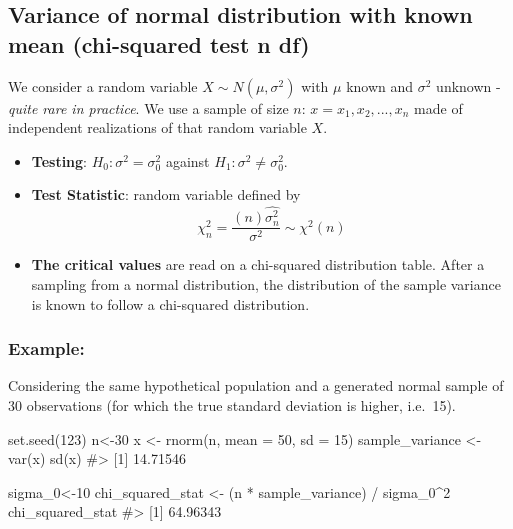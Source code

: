 \documentclass[
  letterpaper,
  DIV=11,
  numbers=noendperiod]{scrreprt}
\newenvironment{Shaded}{\begin{snugshade}}{\end{snugshade}}
\newcommand{\AttributeTok}[1]{\textcolor[rgb]{0.40,0.45,0.13}{#1}}
\newcommand{\CommentTok}[1]{\textcolor[rgb]{0.37,0.37,0.37}{#1}}
\newcommand{\DecValTok}[1]{\textcolor[rgb]{0.68,0.00,0.00}{#1}}
\newcommand{\FunctionTok}[1]{\textcolor[rgb]{0.28,0.35,0.67}{#1}}
\newcommand{\NormalTok}[1]{\textcolor[rgb]{0.00,0.23,0.31}{#1}}
\newcommand{\OtherTok}[1]{\textcolor[rgb]{0.00,0.23,0.31}{#1}}
\newcommand{\SpecialCharTok}[1]{\textcolor[rgb]{0.37,0.37,0.37}{#1}}
\providecommand{\tightlist}{%
  \setlength{\itemsep}{0pt}\setlength{\parskip}{0pt}}\usepackage{longtable,booktabs,array}
\begin{document}
\subsection{Variance of normal distribution with known mean (chi-squared
test n
df)}\label{variance-of-normal-distribution-with-known-mean-chi-squared-test-n-df}

We consider a random variable \(X \sim N(\mu, \sigma^2)\) with \(\mu\)
known and \(\sigma^2\) unknown - \emph{quite rare in practice}. We use a
sample of size \(n\): \(x = {x_1, x_2,..., x_n}\) made of independent
realizations of that random variable \(X\).

\begin{itemize}
\tightlist
\item
  \textbf{Testing}: \(H_0: \sigma^2 = \sigma^2_0\) against
  \(H_1: \sigma^2 \neq \sigma^2_0\).
\item
  \textbf{Test Statistic}: random variable defined by
  \[\chi^2_{n} = \dfrac{(n) \hat{\sigma^2_n}}{\sigma^2} \sim \chi^2(n)\]
\item
  \textbf{The critical values} are read on a chi-squared distribution
  table. After a sampling from a normal distribution, the distribution
  of the sample variance is known to follow a chi-squared distribution.
\end{itemize}

\subsubsection{Example:}\label{example-3}

Considering the same hypothetical population and a generated normal
sample of 30 observations (for which the true standard deviation is
higher, i.e.~15).

\begin{Shaded}
\begin{Highlighting}[]
\FunctionTok{set.seed}\NormalTok{(}\DecValTok{123}\NormalTok{)}
\NormalTok{n}\OtherTok{\textless{}{-}}\DecValTok{30}
\NormalTok{x }\OtherTok{\textless{}{-}} \FunctionTok{rnorm}\NormalTok{(n, }\AttributeTok{mean =} \DecValTok{50}\NormalTok{, }\AttributeTok{sd =} \DecValTok{15}\NormalTok{)}
\NormalTok{sample\_variance }\OtherTok{\textless{}{-}} \FunctionTok{var}\NormalTok{(x)}
\FunctionTok{sd}\NormalTok{(x)}
\CommentTok{\#\textgreater{} [1] 14.71546}
\end{Highlighting}
\end{Shaded}

\begin{Shaded}
\begin{Highlighting}[]
\NormalTok{sigma\_0}\OtherTok{\textless{}{-}}\DecValTok{10}
\NormalTok{chi\_squared\_stat }\OtherTok{\textless{}{-}}\NormalTok{ (n }\SpecialCharTok{*}\NormalTok{ sample\_variance) }\SpecialCharTok{/}\NormalTok{ sigma\_0}\SpecialCharTok{\^{}}\DecValTok{2}
\NormalTok{chi\_squared\_stat}
\CommentTok{\#\textgreater{} [1] 64.96343}
\end{Highlighting}
\end{Shaded}
\end{document}
